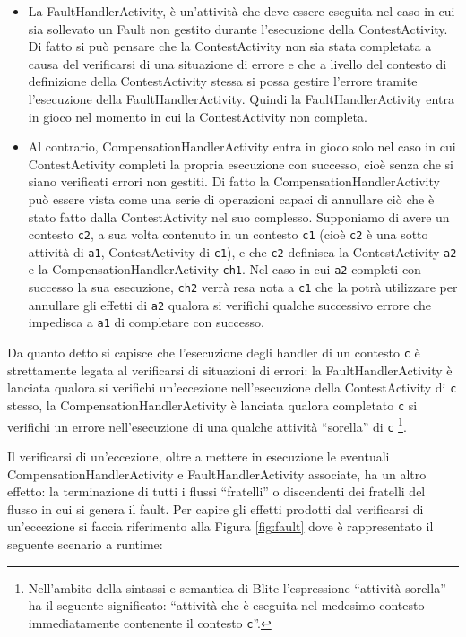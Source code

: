 \begin{itemize}
  \item La FaultHandlerActivity, \`e un'attività che deve essere eseguita nel
  caso in cui sia sollevato un Fault non gestito 
  durante l'esecuzione della ContestActivity. Di fatto si può pensare che la
  ContestActivity non sia stata completata a causa del verificarsi di una 
  situazione di errore e che a livello del contesto di definizione della 
  ContestActivity stessa si possa gestire l'errore tramite l'esecuzione della 
  FaultHandlerActivity. Quindi la FaultHandlerActivity entra in gioco nel
  momento in cui la ContestActivity non completa.
  
  \item Al contrario, CompensationHandlerActivity entra in gioco solo nel caso
  in cui ContestActivity completi la propria esecuzione con successo, cioè
  senza che si siano verificati errori non gestiti. Di fatto la
  CompensationHandlerActivity può essere vista come una serie di operazioni
  capaci di annullare ciò che \`e stato fatto dalla ContestActivity nel suo
  complesso. 
  Supponiamo di avere un contesto \texttt{c2}, a sua volta
  contenuto in un contesto \texttt{c1} (cioè \texttt{c2} \`e una sotto
  attività di \texttt{a1}, ContestActivity di \texttt{c1}), e che
  \texttt{c2} definisca la ContestActivity \texttt{a2} e la CompensationHandlerActivity
  \texttt{ch1}. Nel caso in cui \texttt{a2} completi con successo la sua
  esecuzione, \texttt{ch2} verrà resa nota a \texttt{c1} che la potrà
  utilizzare per annullare gli effetti di \texttt{a2} qualora si verifichi
  qualche successivo errore che impedisca a \texttt{a1} di completare con
  successo.
   
\end{itemize}

Da quanto detto si capisce che l'esecuzione degli handler di un contesto
\texttt{c} \`e strettamente legata al verificarsi di situazioni di errori:
la FaultHandlerActivity \`e lanciata qualora si verifichi un'eccezione
nell'esecuzione della ContestActivity di \texttt{c} stesso, la
CompensationHandlerActivity \`e lanciata qualora completato \texttt{c} si
verifichi un errore nell'esecuzione di una qualche attività ``sorella'' di
\texttt{c} \footnote{Nell'ambito della sintassi e semantica di Blite
l'espressione ``attività sorella'' ha il seguente significato: ``attività che \`e eseguita
nel medesimo contesto immediatamente contenente il contesto \texttt{c}''.}.

Il verificarsi di un'eccezione, oltre a mettere in esecuzione le eventuali
CompensationHandlerActivity e FaultHandlerActivity associate, ha un altro
effetto: la terminazione di tutti i flussi ``fratelli'' o discendenti dei fratelli
del flusso in cui si genera il fault. Per capire gli effetti prodotti dal
verificarsi di un'eccezione si faccia riferimento alla Figura \ref{fig:fault}
dove \`e rappresentato il seguente scenario a runtime:

